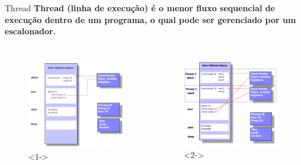 \documentclass[10pt, xcolor=x11names]{beamer}
\begin{document}
\begin{frame}
	\begin{alertblock}{Thread}
		\textbf{Thread (linha de execução) é o menor fluxo sequencial de execução dentro de um programa, o qual pode ser gerenciado por um escalonador.}
	\end{alertblock}
	\begin{columns}
		\begin{figure}
		\centering
			\includegraphics[width=1\linewidth]{img/process}<1->
		\end{figure}

		\begin{figure}
		\centering
			\includegraphics[width=1.\linewidth]{img/thread.png}<2->
		\end{figure}
	\end{columns}

\end{frame}
\end{document}

